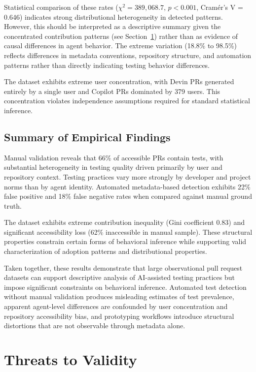 \documentclass[conference]{IEEEtran}
\begin{document}
Statistical comparison of these rates ($\chi^2 = 389{,}068.7$, $p < 0.001$, Cramér's V = 0.646) indicates strong distributional heterogeneity in detected patterns. However, this should be interpreted as a descriptive summary given the concentrated contribution patterns (see Section~\ref{sec:threats}) rather than as evidence of causal differences in agent behavior. The extreme variation (18.8\% to 98.5\%) reflects differences in metadata conventions, repository structure, and automation patterns rather than directly indicating testing behavior differences.

The dataset exhibits extreme user concentration, with Devin PRs generated entirely by a single user and Copilot PRs dominated by 379 users. This concentration violates independence assumptions required for standard statistical inference.

\subsection{Summary of Empirical Findings}

Manual validation reveals that 66\% of accessible PRs contain tests, with substantial heterogeneity in testing quality driven primarily by user and repository context. Testing practices vary more strongly by developer and project norms than by agent identity. Automated metadata-based detection exhibits 22\% false positive and 18\% false negative rates when compared against manual ground truth.

The dataset exhibits extreme contribution inequality (Gini coefficient 0.83) and significant accessibility loss (62\% inaccessible in manual sample). These structural properties constrain certain forms of behavioral inference while supporting valid characterization of adoption patterns and distributional properties.

Taken together, these results demonstrate that large observational pull request datasets can support descriptive analysis of AI-assisted testing practices but impose significant constraints on behavioral inference. Automated test detection without manual validation produces misleading estimates of test prevalence, apparent agent-level differences are confounded by user concentration and repository accessibility bias, and prototyping workflows introduce structural distortions that are not observable through metadata alone.

\section{Threats to Validity}
\label{sec:threats}
\end{document}
